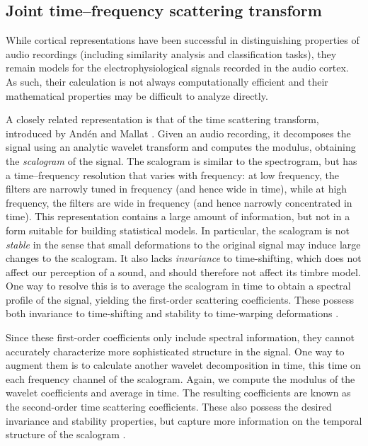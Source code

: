 \documentclass{bmcart}
\begin{document}
\subsection*{Joint time--frequency scattering transform}
\label{sec:scattering}

While cortical representations have been successful in distinguishing properties of audio recordings (including similarity analysis and classification tasks), they remain models for the electrophysiological signals recorded in the audio cortex.
As such, their calculation is not always computationally efficient and their mathematical properties may be difficult to analyze directly.

A closely related representation is that of the time scattering transform, introduced by And\'{e}n and Mallat \cite{anden2011multiscale,anden2014tsp}.
Given an audio recording, it decomposes the signal using an analytic wavelet transform and computes the modulus, obtaining the \emph{scalogram} of the signal.
The scalogram is similar to the spectrogram, but has a time--frequency resolution that varies with frequency: at low frequency, the filters are narrowly tuned in frequency (and hence wide in time), while at high frequency, the filters are wide in frequency (and hence narrowly concentrated in time).
This representation contains a large amount of information, but not in a form suitable for building statistical models.
In particular, the scalogram is not \emph{stable} in the sense that small deformations to the original signal may induce large changes to the scalogram.
It also lacks \emph{invariance} to time-shifting, which does not affect our perception of a sound, and should therefore not affect its timbre model.
One way to resolve this is to average the scalogram in time to obtain a spectral profile of the signal, yielding the first-order scattering coefficients.
These possess both invariance to time-shifting and stability to time-warping deformations \cite{anden2014tsp}.

Since these first-order coefficients only include spectral information, they cannot accurately characterize more sophisticated structure in the signal.
One way to augment them is to calculate another wavelet decomposition in time, this time on each frequency channel of the scalogram.
Again, we compute the modulus of the wavelet coefficients and average in time.
The resulting coefficients are known as the second-order time scattering coefficients.
These also possess the desired invariance and stability properties, but capture more information on the temporal structure of the scalogram \cite{anden2014tsp}.
\end{document}
